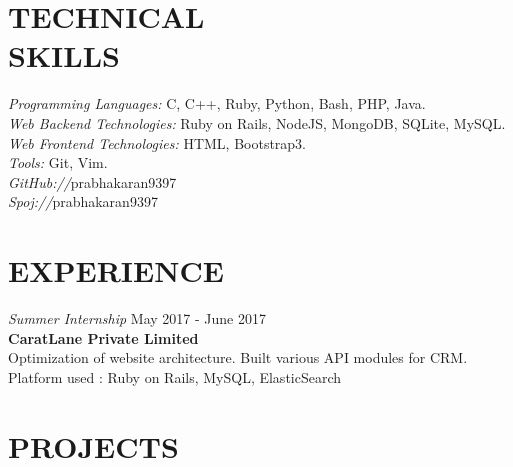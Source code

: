 \documentclass[margin, 10pt]{res} %
\begin{document}
\begin{resume}

    \section{TECHNICAL \\ SKILLS} 

    {\sl Programming Languages:} C, C++, Ruby, Python, Bash, PHP, Java. \\
    {\sl Web Backend Technologies:} Ruby on Rails, NodeJS, MongoDB, SQLite, MySQL. \\
    {\sl Web Frontend Technologies:} HTML, Bootstrap3. \\
    {\sl Tools:} Git, Vim. \\
    {\sl GitHub://}prabhakaran9397 \\
    {\sl Spoj://}prabhakaran9397 \\


    \section{EXPERIENCE}

    {\sl Summer Internship } \hfill May 2017 - June 2017 \\
    {\bf CaratLane Private Limited} \\
    Optimization of website architecture.
    Built various API modules for CRM.
    Platform used : Ruby on Rails, MySQL, ElasticSearch


    \section{PROJECTS}


\end{resume}
\end{document}
